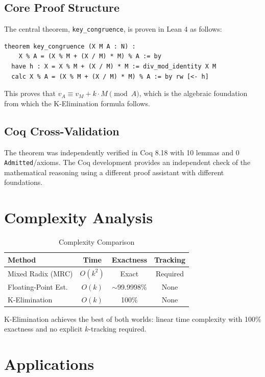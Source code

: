\documentclass[11pt,a4paper]{article}
\begin{document}
\subsection{Core Proof Structure}

The central theorem, \texttt{key\_congruence}, is proven in Lean 4 as follows:

\begin{verbatim}
theorem key_congruence (X M A : N) :
    X % A = (X % M + (X / M) * M) % A := by
  have h : X = X % M + (X / M) * M := div_mod_identity X M
  calc X % A = (X % M + (X / M) * M) % A := by rw [<- h]
\end{verbatim}

This proves that $v_A \equiv v_M + k \cdot M \pmod{A}$, which is the algebraic foundation from which the K-Elimination formula follows.

\subsection{Coq Cross-Validation}

The theorem was independently verified in Coq 8.18 with 10 lemmas and 0 \texttt{Admitted}/axioms. The Coq development provides an independent check of the mathematical reasoning using a different proof assistant with different foundations.

\section{Complexity Analysis}

\begin{table}[h]
\centering
\caption{Complexity Comparison}
\begin{tabular}{@{}lccc@{}}
\toprule
\textbf{Method} & \textbf{Time} & \textbf{Exactness} & \textbf{Tracking} \\
\midrule
Mixed Radix (MRC) & $O(k^2)$ & Exact & Required \\
Floating-Point Est. & $O(k)$ & $\sim$99.9998\% & None \\
K-Elimination & $O(k)$ & 100\% & None \\
\bottomrule
\end{tabular}
\end{table}

K-Elimination achieves the best of both worlds: linear time complexity with 100\% exactness and no explicit $k$-tracking required.

\section{Applications}
\end{document}
